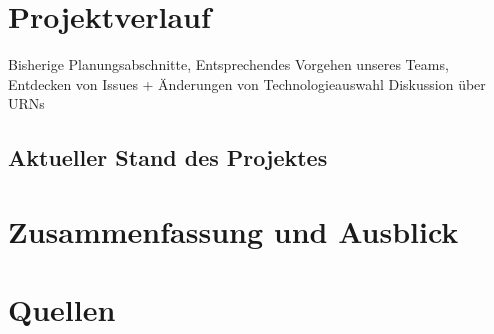 \documentclass{article}
\begin{document}
\section{Projektverlauf}
Bisherige Planungsabschnitte,
Entsprechendes Vorgehen unseres Teams,
Entdecken von Issues + Änderungen von Technologieauswahl
Diskussion über URNs

\subsection{Aktueller Stand des Projektes}

\section{Zusammenfassung und Ausblick}

\section*{Quellen}


\nocite{*}

\end{document}
